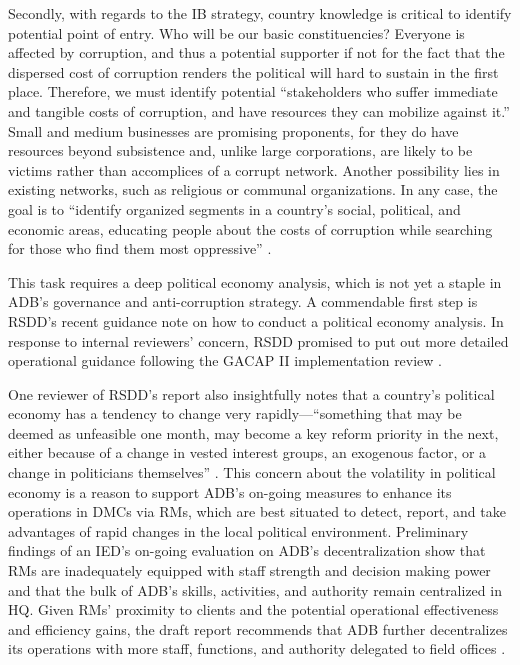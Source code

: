 \documentclass[12pt]{article}
\begin{document}
Secondly, with regards to the IB strategy, country knowledge is critical to identify potential point of entry. Who will be our basic constituencies? Everyone is affected by corruption, and thus a potential supporter if not for the fact that the dispersed cost of corruption renders the political will hard to sustain in the first place. Therefore, we must identify potential ``stakeholders who suffer immediate and tangible costs of corruption, and have resources they can mobilize against it.'' Small and medium businesses are promising proponents, for they do have resources beyond subsistence and, unlike large corporations, are likely to be victims rather than accomplices of a corrupt network. Another possibility lies in existing networks, such as religious or communal organizations. In any case, the goal is to ``identify organized segments in a country's social, political, and economic areas, educating people about the costs of corruption while searching for those who find them most oppressive'' \citep[7]{Johnston2002}.

This task requires a deep political economy analysis, which is not yet a staple in ADB's governance and anti-corruption strategy. A commendable first step is RSDD's recent guidance note on how to conduct a political economy analysis. In response to internal reviewers' concern, RSDD promised to put out more detailed operational guidance following the GACAP II implementation review \citep{RSDD-ADB2013}.

One reviewer of RSDD's report also insightfully notes that a country's political economy has a tendency to change very rapidly---``something that may be deemed as unfeasible one month, may become a key reform priority in the next, either because of a change in vested interest groups, an exogenous factor, or a change in politicians themselves'' \citep[reviewers' comments]{ADB-RSDD2013}. This concern about the volatility in political economy is a reason to support ADB's on-going measures to enhance its operations in DMCs via RMs, which are best situated to detect, report, and take advantages of rapid changes in the local political environment. Preliminary findings of an IED's on-going evaluation on ADB's decentralization show that RMs are inadequately equipped with staff strength and decision making power and that the bulk of ADB's skills, activities, and authority remain centralized in HQ. Given RMs' proximity to clients and the potential operational effectiveness and efficiency gains, the draft report recommends that ADB further decentralizes its operations with more staff, functions, and authority delegated to field offices \citep{ADB-IED2013a}.
\end{document}
